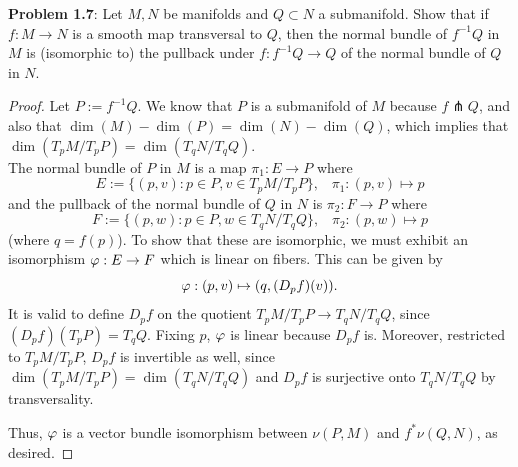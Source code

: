 \documentclass{amsart}
\begin{document}
\newpage 

\textbf{Problem 1.7}: Let $M,N$ be manifolds and $Q\subset N$ a submanifold. Show that if $f:M\to N$ is a smooth map transversal to $Q$, then the normal bundle of $f^{-1}Q$ in $M$ is (isomorphic to) the pullback under $f:f^{-1}Q\to Q$ of the normal bundle of $Q$ in $N$.
\begin{proof}
	Let $P:= f^{-1}Q$. We know that $P$ is a submanifold of $M$ because $f\pitchfork Q$, and also that $\dim(M)-\dim(P)=\dim(N)-\dim(Q)$, which implies that $\dim(T_pM/T_pP)=\dim(T_qN/T_qQ)$.\\
	
%	
	The normal bundle of $P$ in $M$ is a map $\pi_1:E\to P$ where
	$$
	E := \{(p,v): p\in P, v\in T_pM/T_pP\}, \;\;\; \pi_1:(p,v)\mapsto p
	$$
	and the pullback of the normal bundle of $Q$ in $N$ is $\pi_2:F\to P$ where
	$$
	F := \{(p,w): p\in P, w\in T_qN/T_qQ\}, \;\;\; \pi_2:(p,w)\mapsto p
	$$
	(where $q=f(p)$). To show that these are isomorphic, we must exhibit an isomorphism $\varphi:E\to F$ which is linear on fibers. This can be given by
	$$
	\varphi: (p,v) \mapsto (q,(D_pf)(v)).
	$$
	It is valid to define $D_pf$ on the quotient $T_pM/T_pP\to T_qN/T_qQ$, since $(D_pf)(T_pP)=T_qQ$. Fixing $p$, $\varphi$ is linear because $D_pf$ is. Moreover, restricted to $T_pM/T_pP$, $D_pf$ is invertible as well, since $\dim(T_pM/T_pP)=\dim(T_qN/T_qQ)$ and $D_pf$ is surjective onto $T_qN/T_qQ$ by transversality. 
	
	Thus, $\varphi$ is a vector bundle isomorphism between $\nu(P,M)$ and $f^*\nu(Q,N)$, as desired.
\end{proof}
\end{document}
